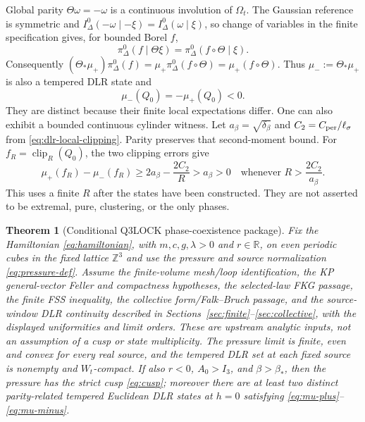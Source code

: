 \documentclass[11pt]{article}
\numberwithin{equation}{section}
\newtheorem{theorem}{Theorem}[section]
\theoremstyle{definition}
\newcommand{\R}{\mathbb R}
\newcommand{\Z}{\mathbb Z}
\begin{document}
Global parity $\Theta\omega=-\omega$ is a continuous involution of
$\Omega_t$.  The Gaussian reference is symmetric and
$I_\Delta^0(-\omega\mid-\xi)=I_\Delta^0(\omega\mid\xi)$, so change of
variables in the finite specification gives, for bounded Borel $f$,
\begin{equation}
 \pi_\Delta^0(f\mid\Theta\xi)
 =\pi_\Delta^0(f\circ\Theta\mid\xi).
 \label{eq:parity-specification-intertwining}
\end{equation}
Consequently
$(\Theta_*\mu_+)\pi_\Delta^0(f)
=\mu_+\pi_\Delta^0(f\circ\Theta)=\mu_+(f\circ\Theta)$.
Thus $\mu_-:=\Theta_*\mu_+$ is also a tempered DLR
state and
\begin{equation}
 \mu_-(Q_0)=-\mu_+(Q_0)<0. \label{eq:mu-minus}
\end{equation}
They are distinct because their finite local expectations differ.  One can
also exhibit a bounded continuous cylinder witness.  Let
$a_\beta=\sqrt{\delta_\beta}$ and $C_2=C_{\rm per}/\ell_\sigma$ from
\eqref{eq:dlr-local-clipping}.  Parity preserves that second-moment bound.
For $f_R=\operatorname{clip}_R(Q_0)$, the two clipping errors give
\begin{equation}
 \mu_+(f_R)-\mu_-(f_R)
 \geq2a_\beta-\frac{2C_2}{R}>a_\beta>0
 \quad\text{whenever } R>\frac{2C_2}{a_\beta}.
 \label{eq:bounded-phase-witness}
\end{equation}
This uses a finite $R$ after the states have been constructed.  They are
not asserted to be extremal, pure, clustering, or the only phases.

\begin{theorem}[Conditional Q3LOCK phase-coexistence package]
\label{thm:q3lock-composition}
Fix the Hamiltonian \eqref{eq:hamiltonian}, with $m,c,g,\lambda>0$ and
$r\in\R$, on
even periodic cubes in the fixed lattice $\Z^3$ and use the pressure and
source normalization \eqref{eq:pressure-def}.
Assume the finite-volume mesh/loop identification, the KP general-vector
Feller and compactness hypotheses, the selected-law FKG passage, the finite
FSS inequality, the collective form/Falk--Bruch passage, and the
source-window DLR continuity described in Sections~\ref{sec:finite}--\ref{sec:collective},
with the displayed uniformities and limit orders.  These are upstream
analytic inputs, not an assumption of a cusp or state multiplicity.
The pressure limit is finite, even and convex for every real source, and
the tempered DLR set at each fixed source is nonempty and $W_t$-compact.
If also $r<0$, $A_0>I_3$, and $\beta>\beta_*$, then the pressure has the
strict cusp \eqref{eq:cusp}; moreover there are at least two distinct
parity-related tempered Euclidean DLR states at $h=0$ satisfying
\eqref{eq:mu-plus}--\eqref{eq:mu-minus}.
\end{theorem}
\end{document}
